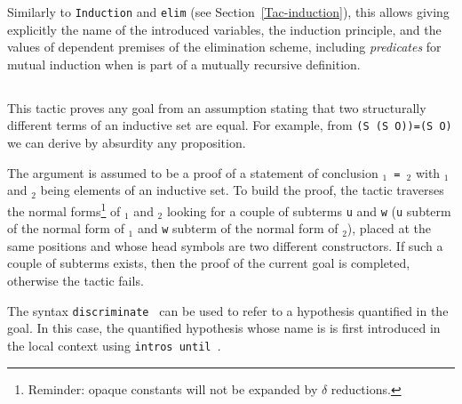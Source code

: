 \SeeAlso{\ref{Function},\ref{FunScheme},\ref{FunScheme-examples},
  \ref{sec:functional-inversion}}

\begin{ErrMsgs}
\item {}
\item {}
\end{ErrMsgs}

\begin{Variants}
\item {}

 Similarly to \texttt{Induction} and \texttt{elim}
 (see Section~\ref{Tac-induction}), this allows giving explicitly the
 name of the introduced variables, the
 induction principle, and the values of dependent premises of the
 elimination scheme, including \emph{predicates} for mutual induction
 when {\qualid} is part of a mutually recursive definition.

\end{Variants}

\subsection{}
\label{discriminate}


This tactic proves any goal from an assumption stating that two
structurally different terms of an inductive set are equal. For
example, from {\tt (S (S O))=(S O)} we can derive by absurdity any
proposition.

The argument {\term} is assumed to be a proof of a statement
of conclusion {\tt{\term$_1$} = {\term$_2$}} with {\term$_1$} and
{\term$_2$} being elements of an inductive set.  To build the proof,
the tactic traverses the normal forms\footnote{Reminder: opaque
  constants will not be expanded by $\delta$ reductions.} of
{\term$_1$} and {\term$_2$} looking for a couple of subterms {\tt u}
and {\tt w} ({\tt u} subterm of the normal form of {\term$_1$} and
{\tt w} subterm of the normal form of {\term$_2$}), placed at the same
positions and whose head symbols are two different constructors. If
such a couple of subterms exists, then the proof of the current goal
is completed, otherwise the tactic fails.

\Rem The syntax {\tt discriminate {\ident}} can be used to refer to a
hypothesis quantified in the goal. In this case, the quantified
hypothesis whose name is {\ident} is first introduced in the local
context using \texttt{intros until \ident}.

